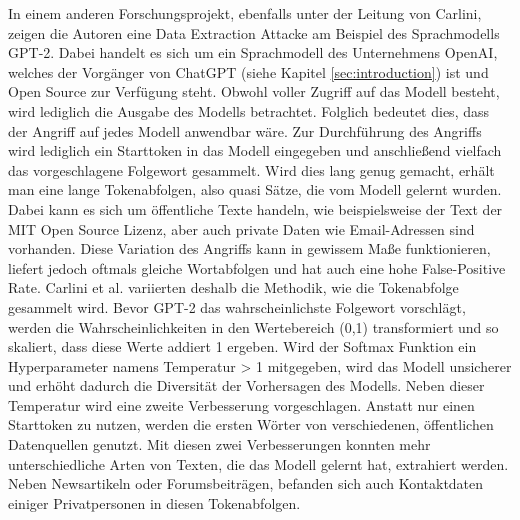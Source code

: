 In einem anderen Forschungsprojekt, ebenfalls unter der Leitung von Carlini, \cite{P-88} zeigen die Autoren eine Data Extraction Attacke am Beispiel des Sprachmodells GPT-2. 
Dabei handelt es sich um ein Sprachmodell des Unternehmens OpenAI, welches der Vorgänger von ChatGPT (siehe Kapitel \ref{sec:introduction}) ist und Open Source zur Verfügung steht.
Obwohl voller Zugriff auf das Modell besteht, wird lediglich die Ausgabe des Modells betrachtet. 
Folglich bedeutet dies, dass der Angriff auf jedes Modell anwendbar wäre.
Zur Durchführung des Angriffs wird lediglich ein Starttoken in das Modell eingegeben und anschließend vielfach das vorgeschlagene Folgewort gesammelt. 
Wird dies lang genug gemacht, erhält man eine lange Tokenabfolgen, also quasi Sätze, die vom Modell gelernt wurden. 
Dabei kann es sich um öffentliche Texte handeln, wie beispielsweise der Text der MIT Open Source Lizenz, aber auch private Daten wie Email-Adressen sind vorhanden.
Diese Variation des Angriffs kann in gewissem Maße funktionieren, liefert jedoch oftmals gleiche Wortabfolgen und hat auch eine hohe False-Positive Rate.
Carlini et al. \cite{P-88} variierten deshalb die Methodik, wie die Tokenabfolge gesammelt wird.
Bevor GPT-2 das wahrscheinlichste Folgewort vorschlägt, werden die Wahrscheinlichkeiten in den Wertebereich (0,1) transformiert und so skaliert, dass diese Werte addiert 1 ergeben.
Wird der Softmax Funktion ein Hyperparameter namens Temperatur > 1 mitgegeben, wird das Modell unsicherer und erhöht dadurch die Diversität der Vorhersagen des Modells.
Neben dieser Temperatur wird eine zweite Verbesserung vorgeschlagen. 
Anstatt nur einen Starttoken zu nutzen, werden die ersten Wörter von verschiedenen, öffentlichen Datenquellen genutzt.
Mit diesen zwei Verbesserungen konnten mehr unterschiedliche Arten von Texten, die das Modell gelernt hat, extrahiert werden. 
Neben Newsartikeln oder Forumsbeiträgen, befanden sich auch Kontaktdaten einiger Privatpersonen in diesen Tokenabfolgen.